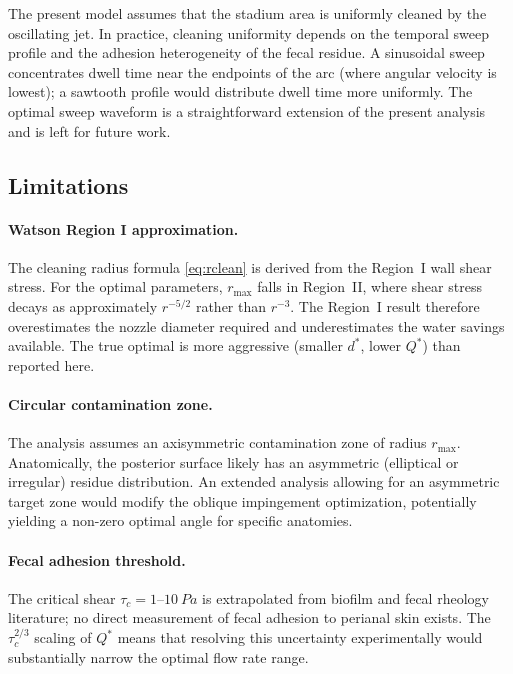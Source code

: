 \documentclass[aps,prfluids,reprint,amsmath,amssymb,floatfix]{revtex4-2}
\begin{document}
The present model assumes that the stadium area is uniformly cleaned by
the oscillating jet. In practice, cleaning uniformity depends on the
temporal sweep profile and the adhesion heterogeneity of the fecal residue.
A sinusoidal sweep concentrates dwell time near the endpoints of the arc
(where angular velocity is lowest); a sawtooth profile would distribute
dwell time more uniformly. The optimal sweep waveform is a straightforward
extension of the present analysis and is left for future work.

\subsection{Limitations}
\label{subsec:disc_limits}

\paragraph{Watson Region I approximation.}
The cleaning radius formula \eqref{eq:rclean} is derived from the Region~I
wall shear stress. For the optimal parameters, $r_\mathrm{max}$ falls in
Region~II, where shear stress decays as approximately $r^{-5/2}$ rather
than $r^{-3}$. The Region~I result therefore overestimates the nozzle
diameter required and underestimates the water savings available. The true
optimal is more aggressive (smaller $d^*$, lower $Q^*$) than reported here.

\paragraph{Circular contamination zone.}
The analysis assumes an axisymmetric contamination zone of radius
$r_\mathrm{max}$. Anatomically, the posterior surface likely has an
asymmetric (elliptical or irregular) residue distribution. An extended
analysis allowing for an asymmetric target zone would modify the oblique
impingement optimization, potentially yielding a non-zero optimal angle
for specific anatomies.

\paragraph{Fecal adhesion threshold.}
The critical shear $\tau_c = 1$--$\SI{10}{Pa}$ is extrapolated from
biofilm and fecal rheology literature; no direct measurement of fecal
adhesion to perianal skin exists. The $\tau_c^{2/3}$ scaling of $Q^*$
means that resolving this uncertainty experimentally would substantially
narrow the optimal flow rate range.
\end{document}
